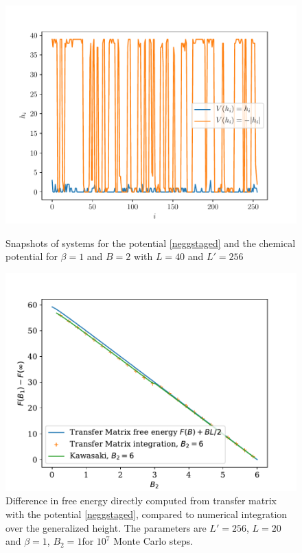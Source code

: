 \begin{figure}
    \centering
	\includegraphics[width=0.7\linewidth]{int-dyn/comp-potentiels-chimiques.pdf}
	\caption{Snapshots of systems for the potential \eqref{neggstaged} and the chemical potential for $\beta=1$ and $B=2$ with $L=40$ and $L'=256$}
    \label{fig-negstagged}	
    \centering
   	\includegraphics[width=0.7\linewidth]{finite-size/integration-free-ene-neg.pdf}
    \caption{Difference in free energy directly computed from transfer matrix with the potential \eqref{neggstaged}, compared to numerical integration over the generalized height. The parameters are $L' = 256$, $L=20$ and $\beta=1$, $B_2 = 1$for $10^7$ Monte Carlo steps. } 
   	\label{fig-int-negstagged}    
\end{figure}  

